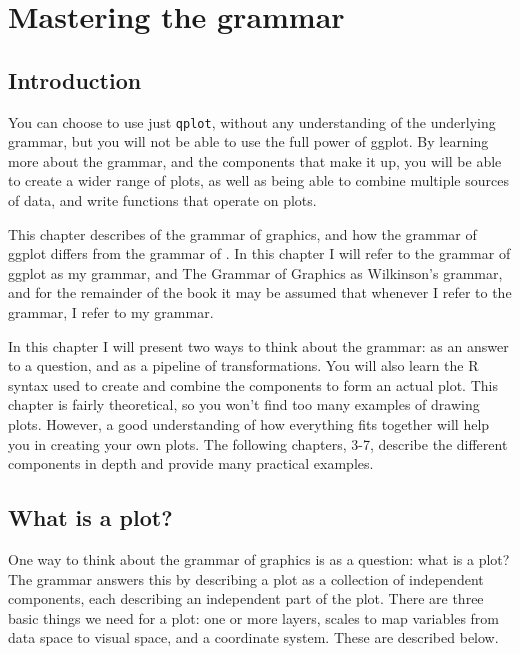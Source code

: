 

\chapter{Mastering the grammar}
\label{cha:mastery}


\section{Introduction}\label{sec:introduction}

You can choose to use just {\tt qplot}, without any understanding of the underlying grammar, but you will not be able to use the full power of ggplot.  By learning more about the grammar, and the components that make it up, you will be able to create a wider range of plots, as well as being able to combine multiple sources of data, and write functions that operate on plots.

This chapter describes of the grammar of graphics, and how the grammar of ggplot differs from the grammar of \citep{wilkinson:2006}.  In this chapter I will refer to the grammar of ggplot as my grammar, and The Grammar of Graphics as Wilkinson's grammar, and for the remainder of the book it may be assumed that whenever I refer to the grammar, I refer to my grammar.

In this chapter I will present two ways to think about the grammar: as an answer to a question, and as a pipeline of transformations.  You will also learn the R syntax used to create and combine the components to form an actual plot. This chapter is fairly theoretical, so you won't find too many examples of drawing plots.  However, a good understanding of how everything fits together will help you in creating your own plots.   The following chapters, 3-7, describe the different components in depth and provide many practical examples.  

\section{What is a plot?}\label{sec:what_is_a_plot}

One way to think about the grammar of graphics is as a question: what is a plot?  The grammar answers this by describing a plot as a collection of independent components, each describing an independent part of the plot.  There are three basic things we need for a plot: one or more layers, scales to map variables from data space to visual space, and a coordinate system.  These are described below.

